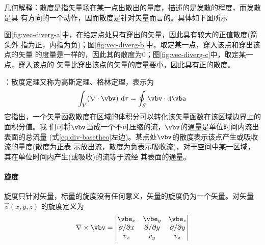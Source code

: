 \uline{几何解释}：散度是指矢量场在某一点出散出的量度，描述的是发散的程度，而发散是具
有方向的一个动作，因而散度是针对矢量而言的。具体如下图所示
\begin{figure}[ht]
    \centering
    \setlength{\abovecaptionskip}{0.2cm}
    \subfloat[]{
        
        \label{fig:vec-diverg-a}
    }
    \hfill
    \subfloat[]{
        
        \label{fig:vec-diverg-b}
    }
    \hfill
    \subfloat[]{
        
        \label{fig:vec-diverg-c}
    }
    \caption{}
    \label{fig:vec-diverg}
\end{figure}
\newline
图\ref{fig:vec-diverg-a}中，在给定点处只有穿出的矢量，因此具有较大的正值散度(箭头外
指为正，内指为负)；图\ref{fig:vec-diverg-b}中，取定某一点，穿入该点和穿出该点的矢量
的度量是一样的，因此其的散度为0；图\ref{fig:vec-diverg-c}中，取定某一点，穿入该点的
矢量比穿出该点的矢量的度量要小，因此具有正的散度。

：散度定理又称为高斯定理、格林定理，表示为
\begin{equation}
    \int_{V} (\nabla \cdot \vbv)\ \mathrm{d} \tau
                         = \oint_{S} \vbv \cdot \mathrm{d} \vba
    \label{eq:div-basetheo}
\end{equation}
它指出，一个矢量函数散度在区域的体积分可以转化该矢量函数在该区域边界上的面积分值。我
们可将$\vbv$当成一个不可压缩的流，$\vbv$的通量是单位时间内流出表面的总流量
(式\eqref{eq:div-basetheo}左边)。某点处$\vbv$的散度表示该点产生或吸收流的量度(散度为正表
示放出流，散度为负表示吸收流)，对于空间中某一区域，其在单位时间内产生(或吸收)的流等于流经
其表面的通量。


\paragraph*{旋度}
旋度只针对矢量，标量的旋度没有任何意义，矢量的旋度仍为一个矢量。对矢量$\vec{v}(x, y, z)$
的旋度定义为
\begin{equation}
    \nabla \times \vbv = 
    \left|\begin{matrix}
        \vbe_x               &   \vbe_y               &   \vbe_z   \\
        \partial / \partial x   &   \partial / \partial y   &   \partial / \partial y  \\
        v_x                     &   v_y                     &   v_z 
    \end{matrix}\right|
    \label{eq:vec-curl}
\end{equation}

